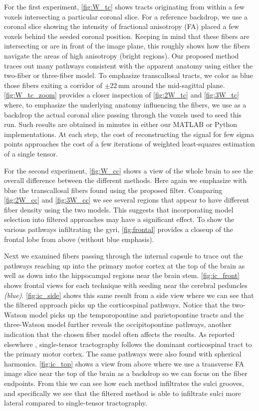 \documentclass[final,hyperref]{gatech-thesis}
\begin{document}
For the first experiment, \autoref{fig:W_tc} shows tracts originating from
within a few voxels intersecting a particular coronal slice.  For a reference
backdrop, we use a coronal slice showing the intensity of fractional
anisotropy (FA) placed a few voxels behind the seeded coronal position.
Keeping in mind that these fibers are intersecting or are in front of the
image plane, this roughly shows how the fibers navigate the areas of high
anisotropy (bright regions).  Our proposed method traces out many pathways
consistent with the apparent anatomy using either the two-fiber or three-fiber
model.  To emphasize transcallosal tracts, we color as blue those fibers
exiting a corridor of $\pm22\,\text{mm}$ around the mid-sagittal plane.
\autoref{fig:W_tc_zoom} provides a closer inspection of \autoref{fig:2W_tc} and
\autoref{fig:3W_tc} where, to emphasize the underlying anatomy influencing the
fibers, we use as a backdrop the actual coronal slice passing through the
voxels used to seed this run.  Such results are obtained in minutes in either
our MATLAB or Python implementations.  At each step, the cost of
reconstructing the signal for few sigma points approaches the cost of a few
iterations of weighted least-squares estimation of a single tensor.

For the second experiment, \autoref{fig:W_cc} shows a view of the whole brain to
see the overall difference between the different methods.  Here again we
emphasize with blue the transcallosal fibers found using the proposed filter.
Comparing \autoref{fig:2W_cc} and \autoref{fig:3W_cc} we see several regions
that appear to have different fiber density using the two models.  This
suggests that incorporating model selection into filtered approaches may have
a significant effect.  To show the various pathways infiltrating the gyri,
\autoref{fig:frontal} provides a closeup of the frontal lobe from above
(without blue emphasis).

Next we examined fibers passing through the internal capsule to trace out the
pathways reaching up into the primary motor cortex at the top of the brain as
well as down into the hippocampal regions near the brain stem.
\autoref{fig:ic_front} shows frontal views for each technique with seeding
near the cerebral peduncles \textit{(blue)}.  \autoref{fig:ic_side} shows this
same result from a side view where we can see that the filtered approach picks
up the corticospinal pathways.  Notice that the two-Watson model picks up the
temporopontine and parietopontine tracts and the three-Watson model further
reveals the occipitopontine pathways, another indication that the chosen fiber
model often affects the results.  As reported elsewhere
\cite{Behrens2007,Qazi2008ni}, single-tensor tractography follows the dominant
corticospinal tract to the primary motor cortex.  The same pathways were also
found with spherical harmonics.
%
\autoref{fig:ic_top} shows a view from above where we use a transverse FA
image slice near the top of the brain as a backdrop so we can focus on the
fiber endpoints.  From this we can see how each method infiltrates the sulci
grooves, and specifically we see that the filtered method is able to
infiltrate sulci more lateral compared to single-tensor tractography.
\end{document}
